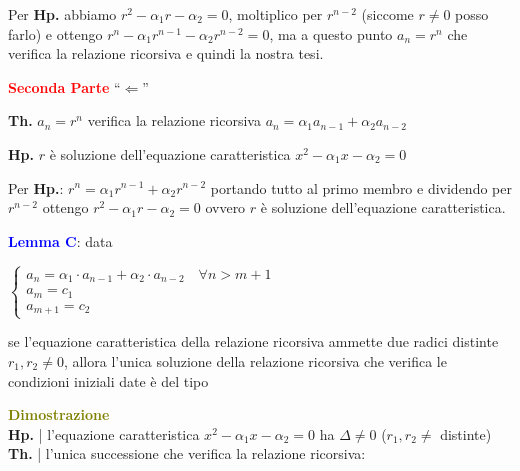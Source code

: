 \begin{flushleft}
\begin{boxA}
        \begin{flushleft}
            Per \textbf{Hp.} abbiamo $r^2 - \alpha_1r - \alpha_2 = 0$, moltiplico per $r^{n-2}$ (siccome $r \neq 0$ posso farlo) e ottengo $r^n - \alpha_1r^{n-1} - \alpha_2r^{n-2} = 0$, ma a questo punto $a_n = r^n$ che verifica la relazione ricorsiva e quindi la nostra tesi.
        \end{flushleft}
        \textcolor{red}{\textbf{Seconda Parte}} ``$\Leftarrow$''

        {\centering
            \begin{minipage}[t]{0.45\textwidth}
                \centering
                \textbf{Th.} $a_n = r^n$ verifica la relazione ricorsiva $a_n = \alpha_1a_{n-1} + \alpha_2a_{n-2}$ \\
            \end{minipage}
            \hfill
            \begin{minipage}[t]{0.45\textwidth}
                \centering
                \textbf{Hp.} $r$ è soluzione dell'equazione caratteristica $x^2 - \alpha_1 x - \alpha_2 = 0$ \\
            \end{minipage}
        \par}
        \begin{flushleft}
            Per \textbf{Hp.}: $r^n = \alpha_1r^{n-1} + \alpha_2r^{n-2}$ portando tutto al primo membro e dividendo per $r^{n-2}$ ottengo $r^2 - \alpha_1r - \alpha_2 = 0$ ovvero $r$ è soluzione dell'equazione caratteristica.
        \end{flushleft}
    \end{boxA}

    \newpage
    \textcolor{blue}{\textbf{Lemma C}}: data

    {\centering
        $\begin{cases}
            a_n = \alpha_1 \cdot a_{n-1} + \alpha_2 \cdot a_{n-2} \quad \forall n > m + 1 \\
            a_m = c_1 \\
            a_{m+1} = c_2
        \end{cases}$
    \par}
    se l'equazione caratteristica della relazione ricorsiva ammette due radici distinte $r_1, r_2 \neq 0$, allora l'unica soluzione della relazione ricorsiva che verifica le condizioni iniziali date è del tipo 
    
    {\centering
    \par}
    \begin{boxA}
        \textcolor{olive}{\textbf{Dimostrazione}} \\
        \textbf{Hp.} | l'equazione caratteristica $x^2 -\alpha_1x - \alpha_2 = 0$ ha $\Delta \neq 0$ ($r_1, r_2 \neq$ distinte) \\
        \textbf{Th.} | l'unica successione che verifica la relazione ricorsiva: 


\end{boxA}
\end{flushleft}
